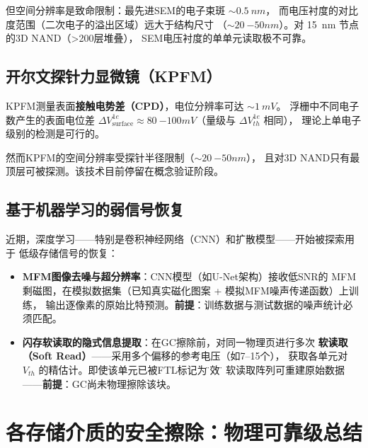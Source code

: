 \documentclass[11pt,a4paper,twoside]{article}
\theoremstyle{definition}\newtheorem{definition}{定义}[section]
\theoremstyle{plain}\newtheorem{theorem}{定理}[section]
\theoremstyle{remark}\newtheorem{remark}{注解}[section]
\begin{document}
但空间分辨率是致命限制：最先进SEM的电子束斑 $\sim \SI{0.5}{nm}$，
而电压衬度的对比度范围（二次电子的溢出区域）远大于结构尺寸
（$\sim \SI{20}{-50}{nm}$）。对 \SI{15}{nm} 节点的3D NAND（>200层堆叠），
SEM电压衬度的单单元读取极不可靠。

\subsection{开尔文探针力显微镜（KPFM）}

KPFM测量表面\textbf{接触电势差（CPD）}，电位分辨率可达 $\sim \SI{1}{mV}$。
浮栅中不同电子数产生的表面电位差 $\Delta V_{\text{surface}}^{1e}
\approx \SI{80}{-100}{mV}$（量级与 $\Delta V_{th}^{1e}$ 相同），
理论上单电子级别的检测是可行的。

然而KPFM的空间分辨率受探针半径限制（$\sim \SI{20}{-50}{nm}$），
且对3D NAND只有最顶层可被探测。该技术目前停留在概念验证阶段。

\subsection{基于机器学习的弱信号恢复}

近期，深度学习——特别是卷积神经网络（CNN）和扩散模型——开始被探索用于
低级存储信号的恢复：

\begin{itemize}
  \item \textbf{MFM图像去噪与超分辨率}：CNN模型（如U-Net架构）接收低SNR的
  MFM剩磁图，在模拟数据集（已知真实磁化图案 + 模拟MFM噪声传递函数）上训练，
  输出逐像素的原始比特预测。\textbf{前提}：训练数据与测试数据的噪声统计必须匹配。
  \item \textbf{闪存软读取的隐式信息提取}：在GC擦除前，对同一物理页进行多次
  \textbf{软读取（Soft Read）}——采用多个偏移的参考电压（如7--15个），
  获取各单元对 $V_{th}$ 的精估计。即使该单元已被FTL标记为\"无效\"，
  软读取阵列可重建原始数据——\textbf{前提}：GC尚未物理擦除该块。
\end{itemize}

\section{各存储介质的安全擦除：物理可靠级总结}
\label{sec:summary}
\end{document}
